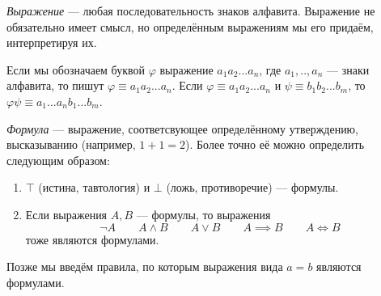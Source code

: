 {\it Выражение} --- любая последовательность знаков алфавита.
Выражение не обязательно имеет смысл, но определённым выражениям мы его придаём,
интерпретируя их.

Если мы обозначаем буквой $\varphi$ выражение $a_1a_2...a_{n}$,
где $a_1,..,a_{n}$ --- знаки алфавита, то пишут $\varphi\equiv a_1a_2...a_{n}$.
Если $\varphi\equiv a_1a_2...a_{n}$ и $\psi\equiv b_1b_2...b_{m}$,
то $\varphi\psi\equiv a_1...a_{n}b_1...b_{m}$.


	{\it Формула} --- выражение, соответсвующее определённому утверждению, высказыванию
(например, $1+1=2$). Более точно её можно определить следующим образом:
\begin{enumerate}
	\item{}$\top$ (истина, тавтология) и $\bot$ (ложь, противоречие) --- формулы.
	\item{}Если выражения $A,B$ --- формулы, то выражения
	\[
		\lnot A\qquad A\land B\qquad A\lor B\qquad A\implies B\qquad A\iff B
	\]
	тоже являются формулами.
\end{enumerate}
Позже мы введём правила, по которым выражения
вида $a=b$ являются формулами.

